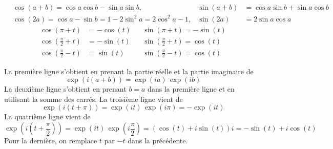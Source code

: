 \begin{propn}
\begin{align*}
 &\cos(a+b)  = \cos a \cos b - \sin a \sin b ,& \sin(a+b) &= \cos a \sin b + \sin a \cos b \\
 &\cos (2a) = \cos a - \sin b = 1 -2\sin^2 a = 2\cos^2 a -1 ,& \sin (2a) &= 2\sin a \cos a
\end{align*}
\begin{align*}
 \cos(\pi+t)&= -\cos(t) & & \sin(\pi+t)=-\sin(t) \\
 \cos(\frac{\pi}{2}+t)&= - \sin(t) & & \sin(\frac{\pi}{2}+t)= \cos(t) \\
 \cos(\frac{\pi}{2}-t)&= \sin(t) & & \sin(\frac{\pi}{2}-t)=\cos(t)
\end{align*}
\end{propn}
\begin{demo}
  La première ligne s'obtient en prenant la partie réelle et la partie imaginaire de 
\begin{displaymath}
  \exp(i(a+b)) = \exp(ia)\,\exp(ib)
\end{displaymath}
  La deuxième ligne s'obtient en prenant $b=a$ dans la première ligne et en utilisant la somme des carrés. La troisième ligne vient de
\begin{displaymath}
  \exp(i(t+\pi)) = \exp(it)\,\exp(i\pi) = -\exp(it)
\end{displaymath}
La quatrième ligne vient de
\begin{displaymath}
  \exp(i(t+\frac{\pi}{2}))= \exp(it)\, \exp(i\frac{\pi}{2}) = (\cos(t) + i\sin(t))i =-\sin(t)+i\cos(t)
\end{displaymath}
Pour la dernière, on remplace $t$ par $-t$ dans la précédente.
\end{demo}


